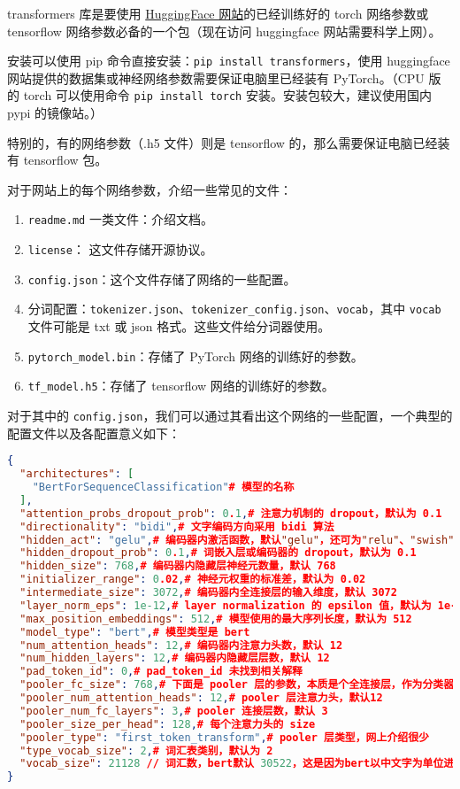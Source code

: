 
\begin{issues}
\issueDraft
\end{issues}

transformers 库是要使用 \href{https://huggingface.co}{HuggingFace 网站}的已经训练好的 torch 网络参数或 tensorflow 网络参数必备的一个包（现在访问 huggingface 网站需要科学上网）。

安装可以使用 pip 命令直接安装：\verb`pip install transformers`，使用 huggingface 网站提供的数据集或神经网络参数需要保证电脑里已经装有 PyTorch。（CPU 版的 torch 可以使用命令 \verb`pip install torch` 安装。安装包较大，建议使用国内 pypi 的镜像站。）

特别的，有的网络参数（.h5 文件）则是 tensorflow 的，那么需要保证电脑已经装有 tensorflow 包。

对于网站上的每个网络参数，介绍一些常见的文件：
\begin{enumerate}
\item \verb`readme.md` 一类文件：介绍文档。
\item \verb`license`： 这文件存储开源协议。
\item \verb`config.json`：这个文件存储了网络的一些配置。
\item 分词配置：\verb`tokenizer.json`、\verb`tokenizer_config.json`、\verb`vocab`，其中 \verb`vocab` 文件可能是 txt 或 json 格式。这些文件给分词器使用。
\item \verb`pytorch_model.bin`：存储了 PyTorch 网络的训练好的参数。
\item \verb`tf_model.h5`：存储了 tensorflow 网络的训练好的参数。
\end{enumerate}

对于其中的 \verb`config.json`，我们可以通过其看出这个网络的一些配置，一个典型的配置文件以及各配置意义如下：
\begin{lstlisting}[language=json]
{
  "architectures": [
    "BertForSequenceClassification"# 模型的名称
  ],
  "attention_probs_dropout_prob": 0.1,# 注意力机制的 dropout，默认为 0.1
  "directionality": "bidi",# 文字编码方向采用 bidi 算法
  "hidden_act": "gelu",# 编码器内激活函数，默认"gelu"，还可为"relu"、"swish"或 "gelu_new"
  "hidden_dropout_prob": 0.1,# 词嵌入层或编码器的 dropout，默认为 0.1
  "hidden_size": 768,# 编码器内隐藏层神经元数量，默认 768
  "initializer_range": 0.02,# 神经元权重的标准差，默认为 0.02
  "intermediate_size": 3072,# 编码器内全连接层的输入维度，默认 3072
  "layer_norm_eps": 1e-12,# layer normalization 的 epsilon 值，默认为 1e-12
  "max_position_embeddings": 512,# 模型使用的最大序列长度，默认为 512
  "model_type": "bert",# 模型类型是 bert
  "num_attention_heads": 12,# 编码器内注意力头数，默认 12
  "num_hidden_layers": 12,# 编码器内隐藏层层数，默认 12
  "pad_token_id": 0,# pad_token_id 未找到相关解释
  "pooler_fc_size": 768,# 下面是 pooler 层的参数，本质是个全连接层，作为分类器解决序列级的NLP任务
  "pooler_num_attention_heads": 12,# pooler 层注意力头，默认12
  "pooler_num_fc_layers": 3,# pooler 连接层数，默认 3
  "pooler_size_per_head": 128,# 每个注意力头的 size
  "pooler_type": "first_token_transform",# pooler 层类型，网上介绍很少
  "type_vocab_size": 2,# 词汇表类别，默认为 2
  "vocab_size": 21128 // 词汇数，bert默认 30522，这是因为bert以中文字为单位进入输入
}
\end{lstlisting}